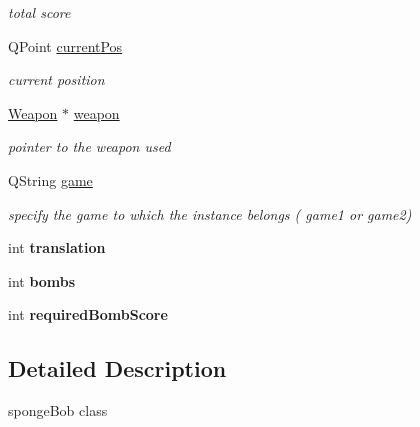 \begin{DoxyCompactItemize}
\begin{DoxyCompactList}\small\item\em total score \end{DoxyCompactList}\item 
\hypertarget{classSpongeBob_aaa6688a6fcf12b0eae3fd3a7f1e137bc}{Q\-Point \hyperlink{classSpongeBob_aaa6688a6fcf12b0eae3fd3a7f1e137bc}{current\-Pos}}\label{classSpongeBob_aaa6688a6fcf12b0eae3fd3a7f1e137bc}

\begin{DoxyCompactList}\small\item\em current position \end{DoxyCompactList}\item 
\hypertarget{classSpongeBob_a264d204946dc5aea60f5f2126fc546d3}{\hyperlink{classWeapon}{Weapon} $\ast$ \hyperlink{classSpongeBob_a264d204946dc5aea60f5f2126fc546d3}{weapon}}\label{classSpongeBob_a264d204946dc5aea60f5f2126fc546d3}

\begin{DoxyCompactList}\small\item\em pointer to the weapon used \end{DoxyCompactList}\item 
\hypertarget{classSpongeBob_a271879173f8458be51a074e89e694403}{Q\-String \hyperlink{classSpongeBob_a271879173f8458be51a074e89e694403}{game}}\label{classSpongeBob_a271879173f8458be51a074e89e694403}

\begin{DoxyCompactList}\small\item\em specify the game to which the instance belongs ( game1 or game2) \end{DoxyCompactList}\item 
\hypertarget{classSpongeBob_a771d252ba5afccc3c428a39e200453fe}{int {\bfseries translation}}\label{classSpongeBob_a771d252ba5afccc3c428a39e200453fe}

\item 
\hypertarget{classSpongeBob_ad9376b9f927ada8f5e9c9871bd86c7ff}{int {\bfseries bombs}}\label{classSpongeBob_ad9376b9f927ada8f5e9c9871bd86c7ff}

\item 
\hypertarget{classSpongeBob_a7dc982197904d3a4f04f8e5d88da80ef}{int {\bfseries required\-Bomb\-Score}}\label{classSpongeBob_a7dc982197904d3a4f04f8e5d88da80ef}

\end{DoxyCompactItemize}


\subsection{Detailed Description}
sponge\-Bob class 

